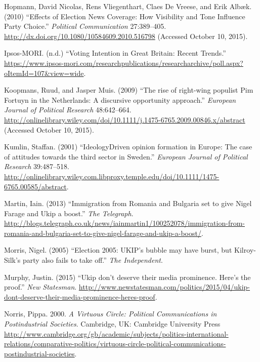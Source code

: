 \documentclass[12pt,article]{article}
\begin{document}
Hopmann, David Nicolas, Rens Vliegenthart, Claes De Vreese, and Erik
Albæk. (2010) ``Effects of Election News Coverage: How Visibility and
Tone Influence Party Choice.'' \emph{Political Communication}
27:389--405. \url{http://dx.doi.org/10.1080/10584609.2010.516798}
(Accessed October 10, 2015).

Ipsos-MORI. (n.d.) ``Voting Intention in Great Britain: Recent Trends.''
\url{https://www.ipsos-mori.com/researchpublications/researcharchive/poll.aspx?oItemId=107\&view=wide}.

Koopmans, Ruud, and Jasper Muis. (2009) ``The rise of right-wing
populist Pim Fortuyn in the Netherlands: A discursive opportunity
approach.'' \emph{European Journal of Political Research} 48:642--664.
\url{http://onlinelibrary.wiley.com/doi/10.1111/j.1475-6765.2009.00846.x/abstract}
(Accessed October 10, 2015).

Kumlin, Staffan. (2001) ``IdeologyDriven opinion formation in Europe:
The case of attitudes towards the third sector in Sweden.''
\emph{European Journal of Political Research} 39:487--518.
\url{http://onlinelibrary.wiley.com.libproxy.temple.edu/doi/10.1111/1475-6765.00585/abstract}.

Martin, Iain. (2013) ``Immigration from Romania and Bulgaria set to give
Nigel Farage and Ukip a boost.'' \emph{The Telegraph}.
\url{http://blogs.telegraph.co.uk/news/iainmartin1/100252078/immigration-from-romania-and-bulgaria-set-to-give-nigel-farage-and-ukip-a-boost/}.

Morris, Nigel. (2005) ``Election 2005: UKIP's bubble may have burst, but
Kilroy-Silk's party also fails to take off.'' \emph{The Independent}.

Murphy, Justin. (2015) ``Ukip don't deserve their media prominence.
Here's the proof.'' \emph{New Statesman}.
\url{http://www.newstatesman.com/politics/2015/04/ukip-dont-deserve-their-media-prominence-heres-proof}.

Norris, Pippa. 2000. \emph{A Virtuous Circle: Political Communications
in Postindustrial Societies}. Cambridge, UK: Cambridge University Press
\url{http://www.cambridge.org/gb/academic/subjects/politics-international-relations/comparative-politics/virtuous-circle-political-communications-postindustrial-societies}.
\end{document}
